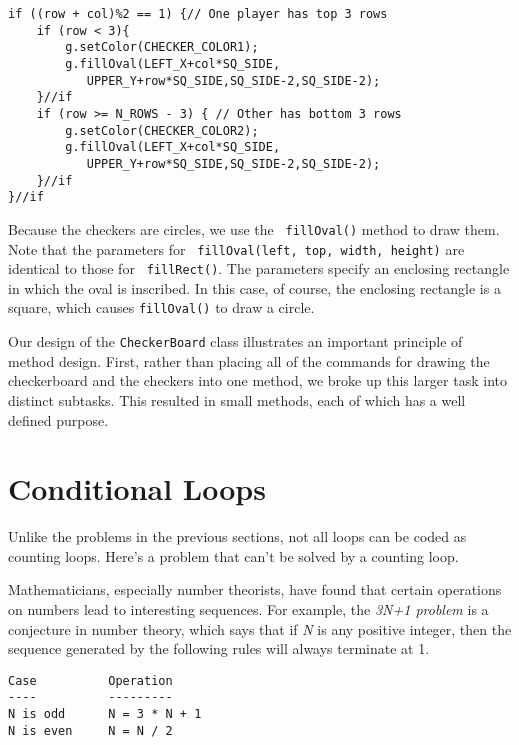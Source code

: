 \begin{jjjlisting}
\begin{lstlisting}
if ((row + col)%2 == 1) {// One player has top 3 rows
    if (row < 3){
        g.setColor(CHECKER_COLOR1);
        g.fillOval(LEFT_X+col*SQ_SIDE,
           UPPER_Y+row*SQ_SIDE,SQ_SIDE-2,SQ_SIDE-2);
    }//if
    if (row >= N_ROWS - 3) { // Other has bottom 3 rows
        g.setColor(CHECKER_COLOR2);
        g.fillOval(LEFT_X+col*SQ_SIDE,
           UPPER_Y+row*SQ_SIDE,SQ_SIDE-2,SQ_SIDE-2);
    }//if
}//if
\end{lstlisting}
\end{jjjlisting}

\noindent Because the checkers are circles, we use the {\tt
fillOval()} method to draw them. Note that the parameters for {\tt
fillOval(left, top, width, height)} are identical to those for {\tt
fillRect()}. The parameters specify an enclosing rectangle in which
the oval is inscribed.  In this case, of course, the enclosing
rectangle is a square, which causes {\tt fillOval()} to draw a
circle.

Our design of the {\tt CheckerBoard} class illustrates an important
principle of method design. First, rather than placing all of the
commands for drawing the checkerboard and the checkers into one
method, we broke up this larger task into distinct subtasks. This
resulted in small methods, each of which has a well defined purpose.


\section{Conditional Loops}
\label{conditional-loops}
\noindent Unlike the problems in the previous sections, not all loops can be
coded as counting loops. Here's a problem that can't be solved by a
counting loop.

Mathematicians, especially number theorists, have found that certain
operations on numbers lead to interesting sequences.  For example, the
{\it 3N+1 problem} is a conjecture in number theory, which says that
if {\it N} is any positive integer, then the sequence generated by the
following rules will always terminate at 1.


\begin{jjjlisting}
\begin{lstlisting}
Case          Operation
----          ---------
N is odd      N = 3 * N + 1
N is even     N = N / 2
\end{lstlisting}
\end{jjjlisting}

